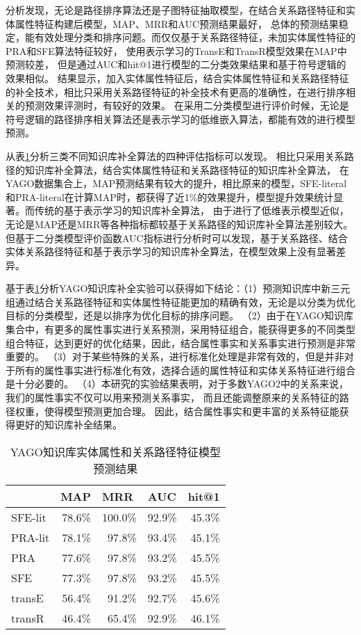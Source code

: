 分析发现，无论是路径排序算法还是子图特征抽取模型，在结合关系路径特征和实体属性特征构建后模型，MAP、MRR和AUC预测结果最好，
总体的预测结果稳定，能有效处理分类和排序问题。而仅仅基于关系路径特征，未加实体属性特征的PRA和SFE算法特征较好，
使用表示学习的TransE和TransR模型效果在MAP中预测较差，
但是通过AUC和hit@1进行模型的二分类效果结果和基于符号逻辑的效果相似。
结果显示，加入实体属性特征后，结合实体属性特征和关系路径特征的补全技术，相比只采用关系路径特征的补全技术有更高的准确性，在进行排序相关的预测效果评测时，有较好的效果。
在采用二分类模型进行评价时候，无论是符号逻辑的路径排序相关算法还是表示学习的低维嵌入算法，都能有效的进行模型预测。

从表\ref{tab:kbc-yago-literal}分析三类不同知识库补全算法的四种评估指标可以发现。
相比只采用关系路径的知识库补全算法，结合实体属性特征和关系路径特征的知识库补全算法，
在YAGO数据集合上，MAP预测结果有较大的提升，相比原来的模型，SFE-literal和PRA-literal在计算MAP时，都获得了近1\%的效果提升，模型提升效果统计显著。而传统的基于表示学习的知识库补全算法，
由于进行了低维表示模型近似，无论是MAP还是MRR等各种指标都较基于关系路径的知识库补全算法差别较大。但基于二分类模型评价函数AUC指标进行分析时可以发现，基于关系路径、结合实体关系路径特征和基于表示学习的知识库补全算法，在模型效果上没有显著差异。

基于表\ref{tab:kbc-yago-literal}分析YAGO知识库补全实验可以获得如下结论：（1）预测知识库中新三元组通过结合关系路径特征和实体属性特征能更加的精确有效，无论是以分类为优化目标的分类模型，还是以排序为优化目标的排序问题。
（2）由于在YAGO知识库集合中，有更多的属性事实进行关系预测，采用特征组合，能获得更多的不同类型组合特征，达到更好的优化结果，因此，结合属性事实和关系事实进行预测是非常重要的。
（3）对于某些特殊的关系，进行标准化处理是非常有效的，但是并非对于所有的属性事实进行标准化有效，选择合适的属性特征和实体关系特征进行组合是十分必要的。
（4）本研究的实验结果表明，对于多数YAGO2中的关系来说，我们的属性事实不仅可以用来预测关系事实，
而且还能调整原来的关系特征的路径权重，使得模型预测更加合理。
因此，结合属性事实和更丰富的关系特征能获得更好的知识库补全结果。
\begin{table}[htbp]
  \centering
  \caption{YAGO知识库实体属性和关系路径特征模型预测结果}
    \begin{tabular}{|l|r|r|r|r|}
    \hline
          & \multicolumn{1}{l|}{MAP} & \multicolumn{1}{l|}{MRR} & \multicolumn{1}{l|}{AUC} & \multicolumn{1}{l|}{hit@1} \\
    \hline
    SFE-lit & 78.6\% & 100.0\% & 92.9\% & 45.3\% \\
    \hline
    PRA-lit & 78.1\% & 97.8\% & 93.4\% & 45.1\% \\
    \hline
    PRA   & 77.6\% & 97.8\% & 93.2\% & 45.5\% \\
    \hline
    SFE   & 77.3\% & 97.8\% & 93.2\% & 45.5\% \\
    \hline
    transE & 56.4\% & 91.2\% & 92.7\% & 45.6\% \\
    \hline
    transR & 46.4\% & 65.4\% & 92.9\% & 46.1\% \\
    \hline
    \end{tabular}%
  \label{tab:kbc-yago-literal}%
\end{table}%


